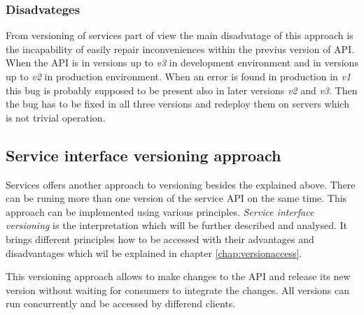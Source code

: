 \subsubsection{Disadvateges}
From versioning of services part of view the main disadvatage of this approach is the incapability of easily repair inconveniences within the previus version of API. When the API is in versions up to \emph{v3} in development environment and in versions up to \emph{v2} in production environment. When an error is found in production in \emph{v1} this bug is probably supposed to be present also in later versions \emph{v2} and \emph{v3}. Then the bug has to be fixed in all three versions and redeploy them on servers which is not trivial operation.

\bigskip


\subsection{Service interface versioning approach}

Services offers another approach to versioning besides the explained above. There can be runing more than one version of the service API on the same time. This approach can be implemented using various principles. \emph{Service interface versioning} is the interpretation which will be further described and analysed. It brings different principles how to be accessed with their advantages and disadvantages which wil be explained in chapter \ref{chap:versionaccess}.

This versioning approach allows to make changes to the API and release its new version without waiting for consumers to integrate the changes. All versions can run concurrently and be accessed by differend clients.
 






\bigskip 





